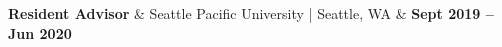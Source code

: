 \textbf{Resident Advisor} & 
Seattle Pacific University | Seattle, WA & 
\textbf{Sept 2019 -- Jun 2020}